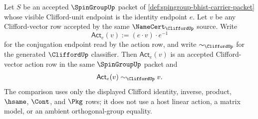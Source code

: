 \begin{theorem}
\label{thm:spingroup-conjugation-action-identity-law}
Let $S$ be an accepted $\SpinGroupUp$ packet of
\autoref{def:spingroup-bhist-carrier-packet} whose visible Clifford-unit
endpoint is the identity endpoint $e$. Let $v$ be any Clifford-vector row
accepted by the same $\NameCert_{\CliffordUp}$ source. Write
$$
\mathsf{Act}_{e}(v):=(e\cdot v)\cdot e^{-1}
$$
for the conjugation endpoint read by the action row, and write
$\sim_{\CliffordUp}$ for the generated $\CliffordUp$ classifier. Then
$\mathsf{Act}_{e}(v)$ is an accepted Clifford-vector action row in the same
$\SpinGroupUp$ packet and
$$
\mathsf{Act}_{e}(v)\sim_{\CliffordUp}v.
$$
The comparison uses only the displayed Clifford identity, inverse, product,
$\hsame$, $\Cont$, and $\Pkg$ rows; it does not use a host linear action, a
matrix model, or an ambient orthogonal-group equality.
\end{theorem}
